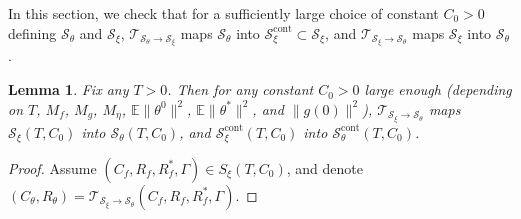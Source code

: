 \documentclass[11pt,letterpaper,reqno]{amsart}
\newtheorem{lem}[thm]{Lemma}
\theoremstyle{definition}
\def\E{\mathbb{E}}
\def\cS{\mathcal{S}}
\def\trsfrmA{\mathcal{T}_{\mathcal{S}_\xi \to {\mathcal{S}}_\theta}}
\def\trsfrmB{\mathcal{T}_{{\mathcal{S}}_\theta \to \mathcal{S}_\xi}}
\begin{document}
In this section, we check that for a sufficiently large choice of constant
$C_0>0$ defining $\cS_\theta$ and $\cS_\xi$,
$\trsfrmB$ maps ${\mathcal{S}}_\theta$ into
$\mathcal{S}^{\mathrm{cont}}_\xi \subset \cS_\xi$, and 
$\trsfrmA$ maps $\mathcal{S}_\xi$ into ${\mathcal{S}}_\theta$.

\begin{lem} \label{lem:solution-in-space}
Fix any $T>0$. Then for any constant $C_0>0$ large enough (depending on $T$,
$M_f$, $M_g$, $M_\eta$, $\E\|\theta^0\|^2$, $\E\|\theta^*\|^2$, and
$\|g(0)\|^2$),
$\trsfrmA$ maps $\mathcal{S}_\xi(T,C_0)$ into ${\mathcal{S}}_\theta(T,C_0)$, and
$\mathcal{S}^{\mathrm{cont}}_\xi(T,C_0)$ into
${\mathcal{S}}^{\mathrm{cont}}_\theta(T,C_0)$.
\end{lem}
\begin{proof}
Assume $(C_f,R_f,R_f^*,\Gamma) \in S_\xi(T,C_0)$, and denote
$(C_\theta,R_\theta)=\trsfrmA(C_f,R_f,R_f^*,\Gamma)$.


\end{proof}
\end{document}
